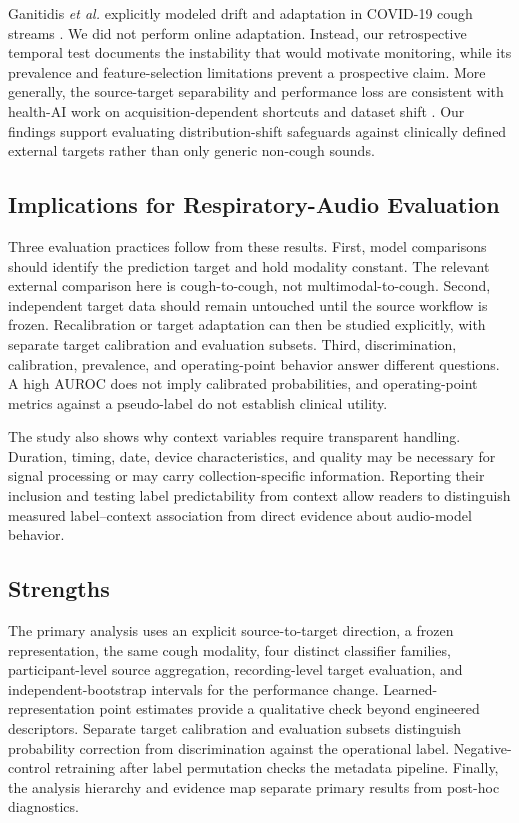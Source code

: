 \documentclass[journal]{IEEEtran}
\begin{document}
Ganitidis \emph{et al.} explicitly modeled drift and adaptation in COVID-19 cough streams \cite{ganitidis2025drift}. We did not perform online adaptation. Instead, our retrospective temporal test documents the instability that would motivate monitoring, while its prevalence and feature-selection limitations prevent a prospective claim. More generally, the source-target separability and performance loss are consistent with health-AI work on acquisition-dependent shortcuts and dataset shift \cite{subbaswamy2020shift,ly2024shortcut}. Our findings support evaluating distribution-shift safeguards against clinically defined external targets rather than only generic non-cough sounds.

\subsection{Implications for Respiratory-Audio Evaluation}

Three evaluation practices follow from these results. First, model comparisons should identify the prediction target and hold modality constant. The relevant external comparison here is cough-to-cough, not multimodal-to-cough. Second, independent target data should remain untouched until the source workflow is frozen. Recalibration or target adaptation can then be studied explicitly, with separate target calibration and evaluation subsets. Third, discrimination, calibration, prevalence, and operating-point behavior answer different questions. A high AUROC does not imply calibrated probabilities, and operating-point metrics against a pseudo-label do not establish clinical utility.

The study also shows why context variables require transparent handling. Duration, timing, date, device characteristics, and quality may be necessary for signal processing or may carry collection-specific information. Reporting their inclusion and testing label predictability from context allow readers to distinguish measured label--context association from direct evidence about audio-model behavior.

\subsection{Strengths}

The primary analysis uses an explicit source-to-target direction, a frozen representation, the same cough modality, four distinct classifier families, participant-level source aggregation, recording-level target evaluation, and independent-bootstrap intervals for the performance change. Learned-representation point estimates provide a qualitative check beyond engineered descriptors. Separate target calibration and evaluation subsets distinguish probability correction from discrimination against the operational label. Negative-control retraining after label permutation checks the metadata pipeline. Finally, the analysis hierarchy and evidence map separate primary results from post-hoc diagnostics.
\end{document}
